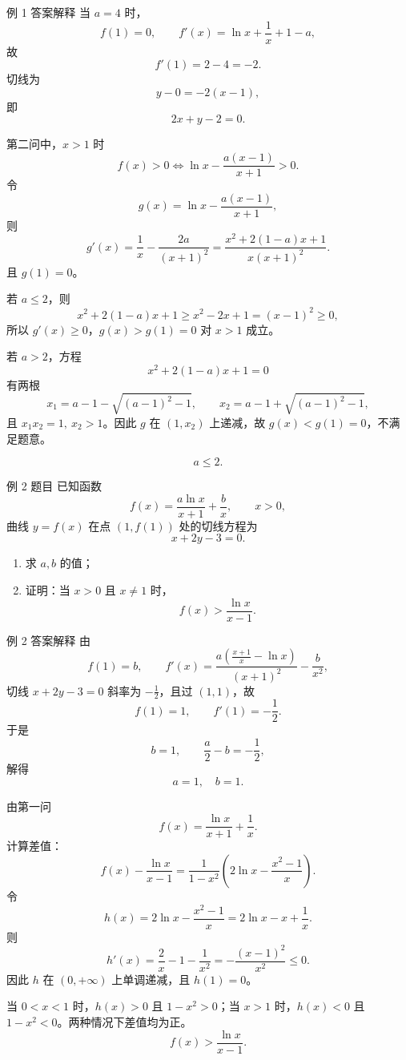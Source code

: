 ﻿\documentclass[aspectratio=169,10pt]{ctexbeamer}
\begin{document}
\begin{frame}[allowframebreaks]{例 1 答案解释}
\small
当 $a=4$ 时，
\[
f(1)=0,\qquad f'(x)=\ln x+\frac1x+1-a,
\]
故
\[
f'(1)=2-4=-2.
\]
切线为
\[
y-0=-2(x-1),
\]
即
\[
\boxed{2x+y-2=0}.
\]

\framebreak

第二问中，$x>1$ 时
\[
f(x)>0
\Longleftrightarrow
\ln x-\frac{a(x-1)}{x+1}>0.
\]
令
\[
g(x)=\ln x-\frac{a(x-1)}{x+1},
\]
则
\[
g'(x)=\frac1x-\frac{2a}{(x+1)^2}
=\frac{x^2+2(1-a)x+1}{x(x+1)^2}.
\]
且 $g(1)=0$。

\framebreak

若 $a\le2$，则
\[
x^2+2(1-a)x+1\ge x^2-2x+1=(x-1)^2\ge0,
\]
所以 $g'(x)\ge0$，$g(x)>g(1)=0$ 对 $x>1$ 成立。

若 $a>2$，方程
\[
x^2+2(1-a)x+1=0
\]
有两根
\[
x_1=a-1-\sqrt{(a-1)^2-1},\qquad
x_2=a-1+\sqrt{(a-1)^2-1},
\]
且 $x_1x_2=1,\ x_2>1$。因此 $g$ 在 $(1,x_2)$ 上递减，故 $g(x)<g(1)=0$，不满足题意。

\[
\boxed{a\le2}.
\]
\end{frame}

\begin{frame}{例 2 题目}
\small
已知函数
\[
f(x)=\frac{a\ln x}{x+1}+\frac bx,\qquad x>0,
\]
曲线 $y=f(x)$ 在点 $(1,f(1))$ 处的切线方程为
\[
x+2y-3=0.
\]
\begin{enumerate}
  \item 求 $a,b$ 的值；
  \item 证明：当 $x>0$ 且 $x\ne1$ 时，
  \[
  f(x)>\frac{\ln x}{x-1}.
  \]
\end{enumerate}
\end{frame}

\begin{frame}[allowframebreaks]{例 2 答案解释}
\small
由
\[
f(1)=b,\qquad f'(x)=
\frac{a\left(\frac{x+1}{x}-\ln x\right)}{(x+1)^2}-\frac b{x^2},
\]
切线 $x+2y-3=0$ 斜率为 $-\frac12$，且过 $(1,1)$，故
\[
f(1)=1,\qquad f'(1)=-\frac12.
\]
于是
\[
b=1,\qquad \frac a2-b=-\frac12,
\]
解得
\[
\boxed{a=1,\quad b=1}.
\]

\framebreak

由第一问
\[
f(x)=\frac{\ln x}{x+1}+\frac1x.
\]
计算差值：
\[
f(x)-\frac{\ln x}{x-1}
=\frac1{1-x^2}\left(2\ln x-\frac{x^2-1}{x}\right).
\]
令
\[
h(x)=2\ln x-\frac{x^2-1}{x}=2\ln x-x+\frac1x.
\]
则
\[
h'(x)=\frac2x-1-\frac1{x^2}
=-\frac{(x-1)^2}{x^2}\le0.
\]
因此 $h$ 在 $(0,+\infty)$ 上单调递减，且 $h(1)=0$。

当 $0<x<1$ 时，$h(x)>0$ 且 $1-x^2>0$；当 $x>1$ 时，$h(x)<0$ 且 $1-x^2<0$。两种情况下差值均为正。
\[
\boxed{f(x)>\frac{\ln x}{x-1}}.
\]
\end{frame}
\end{document}
